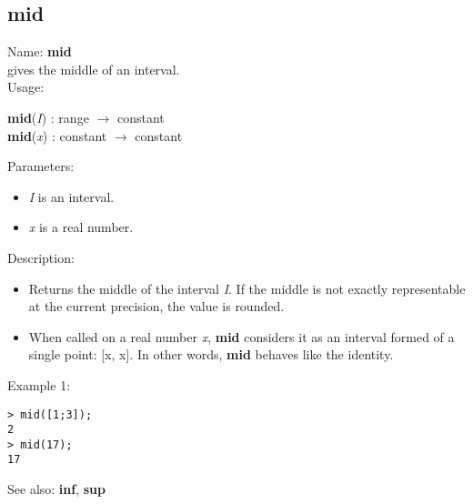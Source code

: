 \subsection{ mid }
\noindent Name: \textbf{mid}\\
gives the middle of an interval.\\

\noindent Usage: 
\begin{center}
\textbf{mid}(\emph{I}) : \textsf{range} $\rightarrow$ \textsf{constant}\\
\textbf{mid}(\emph{x}) : \textsf{constant} $\rightarrow$ \textsf{constant}\\
\end{center}
Parameters: 
\begin{itemize}
\item \emph{I} is an interval.
\item \emph{x} is a real number.
\end{itemize}
\noindent Description: \begin{itemize}

\item Returns the middle of the interval \emph{I}. If the middle is not exactly 
   representable at the current precision, the value is rounded.

\item When called on a real number \emph{x}, \textbf{mid} considers it as an interval formed
   of a single point: [x, x]. In other words, \textbf{mid} behaves like the identity.
\end{itemize}
\noindent Example 1: 
\begin{center}\begin{minipage}{15cm}\begin{Verbatim}[frame=single]
> mid([1;3]);
2
> mid(17);
17
\end{Verbatim}
\end{minipage}\end{center}
See also: \textbf{inf}, \textbf{sup}
